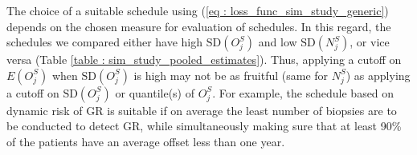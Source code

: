 The choice of a suitable schedule using (\ref{eq : loss_func_sim_study_generic}) depends on the chosen measure for evaluation of schedules. In this regard, the schedules we compared either have high $\mbox{SD}(O^S_j)$ and low $\mbox{SD}(N^S_j)$, or vice versa (Table \ref{table : sim_study_pooled_estimates}). Thus, applying a cutoff on $E(O^S_j)$ when $\mbox{SD}(O^S_j)$ is high may not be as fruitful (same for $N^S_j$) as applying a cutoff on $\mbox{SD}(O^S_j)$ or quantile(s) of $O^S_j$. For example, the schedule based on dynamic risk of GR is suitable if on average the least number of biopsies are to be conducted to detect GR, while simultaneously making sure that at least 90\% of the patients have an average offset less than one year.
